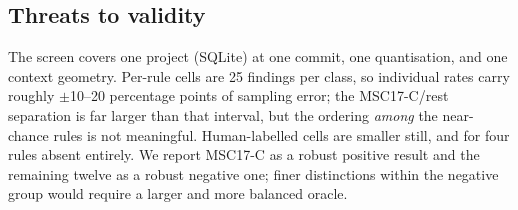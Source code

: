 \subsection{Threats to validity}

The screen covers one project (SQLite) at one commit, one quantisation,
and one context geometry.  Per-rule cells are 25 findings per class, so
individual rates carry roughly $\pm$10--20 percentage points of
sampling error; the MSC17-C/rest separation is far larger than that
interval, but the ordering \emph{among} the near-chance rules is not
meaningful.  Human-labelled cells are smaller still, and for four rules
absent entirely.  We report MSC17-C as a robust positive result and the
remaining twelve as a robust negative one; finer distinctions within
the negative group would require a larger and more balanced oracle.

